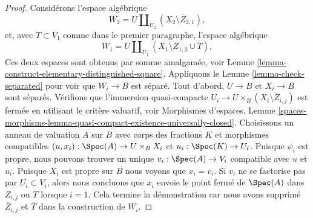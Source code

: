 \begin{proof}
\medskip\noindent
Considérons l'espace algébrique
$$
W_2 = U \coprod\nolimits_{U_2} (X_2 \setminus \overline{Z}_{2, 1}),
$$
et, avec $T \subset V_1$ comme dans le premier paragraphe, l'espace algébrique
$$
W_1 = U \coprod\nolimits_{U_1}
(X_1 \setminus \overline{Z}_{1, 2} \cup \overline{T}),
$$
Ces deux espaces sont obtenus par somme amalgamée, voir
Lemme \ref{lemma-construct-elementary-distinguished-square}.
Appliquons le Lemme \ref{lemma-check-separated}
pour voir que $W_i \to B$ est séparé. Tout d'abord,
$U \to B$ et $X_i \to B$ sont séparés. Vérifions que l'immersion quasi-compacte $U_i \to U \times_B (X_i \setminus \overline{Z}_{i, j})$
est fermée en utilisant le critère valuatif, voir Morphismes d'espaces, Lemme
\ref{spaces-morphisms-lemma-quasi-compact-existence-universally-closed}.
Choisissons un anneau de valuation $A$ sur $B$ avec corps des fractions $K$ et
morphismes compatibles $(u, x_i) : \Spec(A) \to U \times_B X_i$ et
$u_i : \Spec(K) \to U_i$. Puisque $\psi_i$ est propre, nous
pouvons trouver un unique $v_i : \Spec(A) \to V_i$ compatible avec
$u$ et $u_i$. Puisque $X_i$ est propre sur $B$ nous voyons que $x_i = v_i$. Si $v_i$ ne se factorise pas par $U_i \subset V_i$, alors nous concluons que $x_i$ envoie le point fermé de $\Spec(A)$ dans $Z_{i, j}$ ou $T$ lorsque $i = 1$. Cela termine la démonstration car nous avons supprimé $\overline{Z}_{i, j}$ et $\overline{T}$ dans la construction de $W_i$.


\end{proof}
